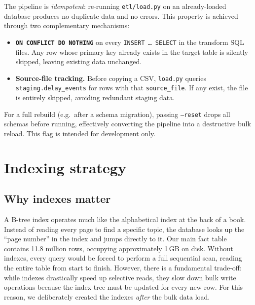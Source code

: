 \documentclass[a4paper,11pt]{article}
\begin{document}
The pipeline is \emph{idempotent}: re-running \texttt{etl/load.py} on an already-loaded
database produces no duplicate data and no errors.
This property is achieved through two complementary mechanisms:

\begin{itemize}
  \item \textbf{\texttt{ON CONFLICT DO NOTHING}} on every
    \texttt{INSERT \ldots{} SELECT} in the transform SQL files.
    Any row whose primary key already exists in the target table is silently
    skipped, leaving existing data unchanged.
  \item \textbf{Source-file tracking.}
    Before copying a CSV, \texttt{load.py} queries
    \texttt{staging.delay\_events} for rows with that \texttt{source\_file}.
    If any exist, the file is entirely skipped, avoiding redundant staging data.
\end{itemize}

For a full rebuild (e.g.\ after a schema migration), passing \texttt{--reset}
drops all schemas before running, effectively converting the pipeline into a
destructive bulk reload.
This flag is intended for development only.


\newpage
\section{Indexing strategy}
\label{sec:indexing}

\subsection{Why indexes matter}

A B-tree index operates much like the alphabetical index at the back of a book. Instead of reading every page to find a specific topic, the database looks up the ``page number'' in the index and jumps directly to it. Our main fact table contains 11.8 million rows, occupying approximately 1\,GB on disk. Without indexes, every query would be forced to perform a full sequential scan, reading the entire table from start to finish. However, there is a fundamental trade-off: while indexes drastically speed up selective reads, they slow down bulk write operations because the index tree must be updated for every new row. For this reason, we deliberately created the indexes \emph{after} the bulk data load.
\end{document}

